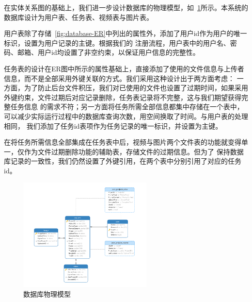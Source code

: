 在实体关系图的基础上，我们进一步设计数据库的物理模型，如~\ref{fig:database-design}所示。本系统的数据库设计为用户表、任务表、视频表与图片表。

用户表除了存储~\ref{fig:database-ER}中列出的属性外，添加了用户id作为用户的唯一标识，设置为用户记录的主键。根据我们的
注册流程，用户表中的用户名、密码、邮箱、用户id均设置了非空约束，以保证用户信息的完整性。

任务表的设计在ER图中所示的属性基础上，直接添加了使用的文件信息与上传者信息，而不是全部采用外键关联的方式。我们采用这种设计出于两方面考虑：
一方面，为了防止后台文件积压，我们对已使用的文件也设置了过期时间，如果采用外键约束，文件过期后对应记录删除，任务表记录将不完整，这与我们期望获得完整任务信息
的需求不符；另一方面将任务所需全部信息都集中存储在一个表中，可以减少实际运行过程中的数据库查询次数，用空间换取了时间。与用户表的处理相同，
我们添加了任务id表项作为任务记录的唯一标识，并设置为主键。

在将任务所需信息全部集成在任务表中后，视频与图片两个文件表的功能就变得单一，仅作为文件过期删除功能的辅助表，存储文件的过期信息。但为了
保持数据库记录的一致性，我们仍然设置了外键引用，在两个表中分别引用了对应的任务id。

\begin{figure}[ht]
    \centering
    \includegraphics[width=0.6\textwidth]{source/img/database_design.png}
    \caption{数据库物理模型}
    \label{fig:database-design}
\end{figure}
